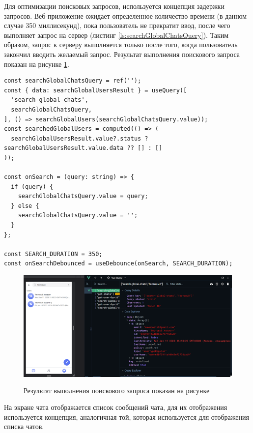 Для оптимизации поисковых запросов, используется концепция задержки запросов. Веб-приложение ожидает определенное количество времени (в данном случае 350 миллисекунд), пока пользователь не прекратит ввод, после чего выполняет запрос на сервер (листинг \ref{ls:searchGlobalChatsQuery}). Таким образом, запрос к серверу выполняется только после того, когда пользователь закончил вводить желаемый запрос. Результат выполнения поискового запроса показан на рисунке \ref{fig:web-app-search-query}.

\begin{lstlisting}[caption={Использование TanStack Query для запросов на сервер с задержкой}, label={ls:searchGlobalChatsQuery}]
const searchGlobalChatsQuery = ref('');
const { data: searchGlobalUsersResult } = useQuery([
  'search-global-chats',
  searchGlobalChatsQuery,
], () => searchGlobalUsers(searchGlobalChatsQuery.value));
const searchedGlobalUsers = computed(() => (
  searchGlobalUsersResult.value?.status ? searchGlobalUsersResult.value.data ?? [] : []
));

const onSearch = (query: string) => {
  if (query) {
    searchGlobalChatsQuery.value = query;
  } else {
    searchGlobalChatsQuery.value = '';
  }
};

const SEARCH_DURATION = 350;
const onSearchDebounced = useDebounce(onSearch, SEARCH_DURATION);
\end{lstlisting}

\begin{figure}[H]
\begin{center}
\includegraphics[width=1.0\hsize]{fig/web-app-search-query.png}\\[2mm]
\caption{Результат выполнения поискового запроса показан на рисунке}\label{fig:web-app-search-query}
\end{center}
\end{figure}

На экране чата отображается список сообщений чата, для их отображения используется концепция, аналогичная той, которая используется для отображения списка чатов.

